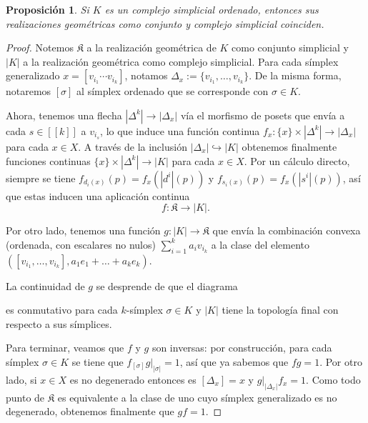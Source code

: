 \documentclass[11pt]{report}
\theoremstyle{colored}
\newtheorem{proposition}{Proposición}[section]
\newcommand{\nat}[1]{[\![#1]\!]}
\newcommand{\ord}[1]{\nat{#1}}
\renewcommand{\ss}[1]{\Delta^{#1}}
\begin{document}
\begin{proposition} Si $K$ es un complejo simplicial ordenado, entonces sus realizaciones geométricas como conjunto y complejo simplicial coinciden.
\end{proposition}
\begin{proof} Notemos $\mathfrak{K}$ a la realización geométrica de $K$ como conjunto simplicial y $|K|$ a la realización geométrica como complejo simplicial. Para cada símplex generalizado $x  = [v_{i_1}\cdots v_{i_k}]$, notamos $\Delta_x := \{v_{i_1}, \dots, v_{i_k}\}$. De la misma forma, notaremos $[\sigma]$ al símplex ordenado que se corresponde con $\sigma \in K$.

Ahora, tenemos una flecha $|\ss{k}| \to |\Delta_x|$ vía el morfismo de posets que envía a cada $s \in \ord{k}$ a $v_{i_s}$, lo que induce una función continua  $f_x : \{x\} \times |\Delta^k| \to |\Delta_x|$ para cada $x\in X$. A través de la inclusión $|\Delta_x| \hookrightarrow |K|$ obtenemos finalmente funciones continuas $ \{x\} \times |\ss{k}| \to |K|$ para cada $x \in X$. Por un cálculo directo, siempre se tiene $f_{d_i(x)}(p)  = f_x(|d^i|(p))$ y $f_{s_i(x)}(p) = f_x(|s^i|(p))$, así que estas inducen una aplicación continua
\[
f: \mathfrak{K} \to |K|.
\]

Por otro lado, tenemos una función $g : |K| \to \mathfrak{K}$ que envía la combinación convexa (ordenada, con escalares no nulos) $\sum_{i=1}^k a_iv_{i_k}$ a la clase del elemento $([v_{i_1}, \dots, v_{i_k}] ,a_1e_1 + \dots + a_ke_k)$.

La continuidad de $g$ se desprende de que el diagrama
\begin{center}
\end{center}
es conmutativo para cada $k$-símplex $\sigma \in K$ y $|K|$ tiene la topología final con respecto a sus símplices. 

Para terminar, veamos que $f$ y $g$ son inversas: por construcción, para cada símplex $\sigma \in K$ se tiene que $f_{[\sigma]}g|_{|\sigma|} = 1$, así que ya sabemos que $fg = 1$. Por otro lado, si $x \in X$ es no degenerado entonces es $[\Delta_x] = x$ y  $g|_{|\Delta_x|}f_x = 1$. Como todo punto de $\mathfrak{K}$ es equivalente a la clase de uno cuyo símplex generalizado es no degenerado, obtenemos finalmente que $gf = 1$.
\end{proof}
\end{document}
